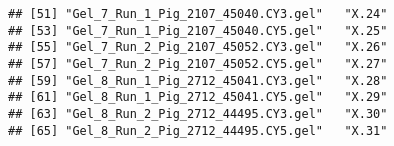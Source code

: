 \documentclass{article}\usepackage[]{graphicx}\usepackage[]{color}
\makeatletter
\newenvironment{kframe}{%
 \def\at@end@of@kframe{}%
 \ifinner\ifhmode%
  \def\at@end@of@kframe{\end{minipage}}%
  \begin{minipage}{\columnwidth}%
 \fi\fi%
 \def\FrameCommand##1{\hskip\@totalleftmargin \hskip-\fboxsep
 \colorbox{shadecolor}{##1}\hskip-\fboxsep
     \hskip-\linewidth \hskip-\@totalleftmargin \hskip\columnwidth}%
 \MakeFramed {\advance\hsize-\width
   \@totalleftmargin\z@ \linewidth\hsize
   \@setminipage}}%
 {\par\unskip\endMakeFramed%
 \at@end@of@kframe}
\newenvironment{knitrout}{}{} %
\makeatother
\begin{document}
\begin{knitrout}
\begin{kframe}
\begin{verbatim}
## [51] "Gel_7_Run_1_Pig_2107_45040.CY3.gel"   "X.24"                                
## [53] "Gel_7_Run_1_Pig_2107_45040.CY5.gel"   "X.25"                                
## [55] "Gel_7_Run_2_Pig_2107_45052.CY3.gel"   "X.26"                                
## [57] "Gel_7_Run_2_Pig_2107_45052.CY5.gel"   "X.27"                                
## [59] "Gel_8_Run_1_Pig_2712_45041.CY3.gel"   "X.28"                                
## [61] "Gel_8_Run_1_Pig_2712_45041.CY5.gel"   "X.29"                                
## [63] "Gel_8_Run_2_Pig_2712_44495.CY3.gel"   "X.30"                                
## [65] "Gel_8_Run_2_Pig_2712_44495.CY5.gel"   "X.31"
\end{verbatim}
\end{kframe}
\end{knitrout}
\end{document}
